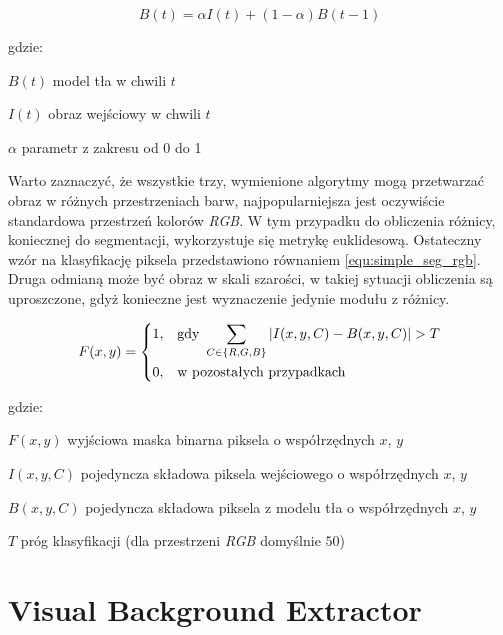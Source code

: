 	\begin{equation}
	    B(t) = \alpha I(t) + (1 - \alpha)B(t-1) 
	\label{equ:adaptive_bg_sub}
	\end{equation}	
	
\noindent gdzie:
\begin{eqwhere}[2cm]
 \item[$B(t)$] model tła w chwili $t$
 \item[$I(t)$] obraz wejściowy w chwili $t$
 \item[$\alpha$] parametr z zakresu od 0 do 1\\
\end{eqwhere}

Warto zaznaczyć, że wszystkie trzy, wymienione algorytmy mogą przetwarzać obraz w różnych przestrzeniach barw, najpopularniejsza jest oczywiście standardowa przestrzeń kolorów \textit{RGB}. W tym przypadku do obliczenia różnicy, koniecznej do segmentacji, wykorzystuje się metrykę euklidesową. Ostateczny wzór na klasyfikację piksela przedstawiono równaniem \ref{equ:simple_seg_rgb}. Druga odmianą może być obraz w skali szarości, w takiej sytuacji obliczenia są uproszczone, gdyż konieczne jest wyznaczenie jedynie modułu z różnicy.

    \begin{equation}
        F(x,y) = 
		\begin{dcases}
    		1, & \text{gdy } \sum_{C \in \{R,G,B\}} | I(x,y,C) - B(x,y,C) | > T \\
    		0, & \text{w pozostałych przypadkach} 
		\end{dcases}        
    \label{equ:simple_seg_rgb}
    \end{equation}     

\noindent gdzie:
\begin{eqwhere}[2.5cm]
 \item[$F(x,y)$] wyjściowa maska binarna piksela o współrzędnych $x$, $y$
 \item[$I(x,y,C)$] pojedyncza składowa piksela wejściowego o współrzędnych $x$, $y$
 \item[$B(x,y,C)$] pojedyncza składowa piksela z modelu tła o współrzędnych $x$, $y$
 \item[$T$] próg klasyfikacji (dla przestrzeni \textit{RGB} domyślnie $50$)\\
\end{eqwhere}

\section{Visual Background Extractor}
\label{sec:vibe_teoria}

